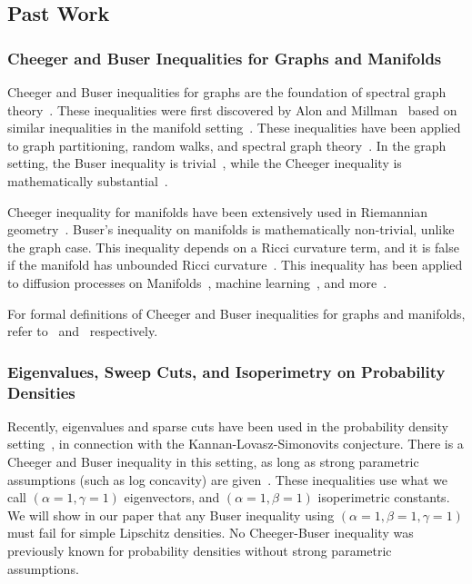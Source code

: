 \subsection{Past Work}\label{sec:past-work}

\subsubsection{Cheeger and Buser Inequalities for Graphs and Manifolds}

Cheeger and Buser inequalities for graphs are the foundation of spectral
graph theory~\cite{ChungBook97}. These inequalities were first
discovered by Alon and Millman~\cite{AlonM84} based on similar
inequalities in the manifold setting~\cite{Cheeger70, Buser82}. These
inequalities have been applied to graph partitioning,
random walks, and spectral graph theory~\cite{ChungBook97,
kw16, Orecchia08, Louis12, Lee2014, Orecchia2011, 
  SpielmanTeng2004}. In the graph setting, the Buser inequality is
  trivial~\cite{ChungBook97}, while the Cheeger inequality is
  mathematically substantial~\cite{AlonM84}.

  Cheeger inequality for manifolds have been extensively used in
  Riemannian geometry~\cite{Cheeger70, belkin2004semisup,
  belkin2005towards}.  Buser's inequality on manifolds is 
  mathematically non-trivial, unlike the graph case. This inequality
  depends on a Ricci curvature term, and it is false if the manifold has
  unbounded Ricci curvature~\cite{Buser82, ledoux2004spectral}. This
  inequality has been applied to diffusion
  processes on Manifolds~\cite{ledoux2004spectral}, machine
  learning~\cite{belkin2004semisup, grady2006isoperimetric}, and more~\cite{ledoux2004spectral}.

  For formal definitions of Cheeger and Buser inequalities for graphs
  and manifolds, refer to~\cite{AlonM84} and~\cite{Buser82}
  respectively.

\subsubsection{Eigenvalues, Sweep Cuts, and Isoperimetry on Probability
Densities}\label{sec:past-prob}

Recently, eigenvalues and sparse cuts have been used in the probability
density setting~\cite{Lee18, Lee18survey}, in connection with the
Kannan-Lovasz-Simonovits conjecture. There is a Cheeger and Buser inequality in
this setting, as long as strong parametric assumptions (such as log
concavity) are given~\cite{Lee18survey}. These inequalities use
what we call $(\alpha=1, \gamma=1)$ eigenvectors, and $(\alpha=1, \beta=1)$
isoperimetric constants.  
We will show in our paper that any Buser
inequality using $(\alpha = 1, \beta = 1, \gamma=1)$ must fail for
simple Lipschitz densities.
No Cheeger-Buser inequality was previously known for
probability densities without strong
parametric assumptions.

